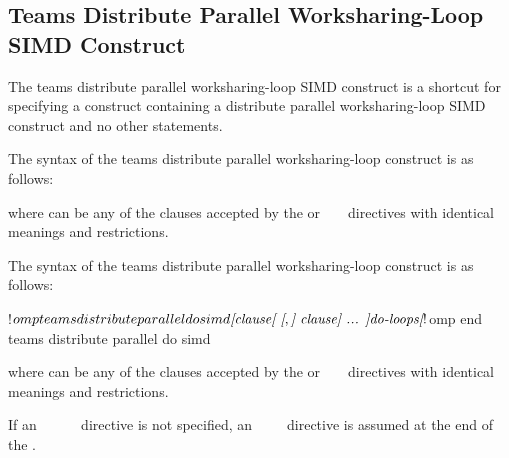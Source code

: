 \subsection{Teams Distribute Parallel Worksharing-Loop SIMD Construct}
\label{subsec:Teams Distribute Parallel Worksharing-Loop SIMD Construct}
\summary
The teams distribute parallel worksharing-loop SIMD construct is a shortcut for specifying a 
construct containing a distribute parallel worksharing-loop SIMD construct and no other statements.


\syntax
\begin{ccppspecific}
The syntax of the teams distribute parallel worksharing-loop construct is as follows:

\begin{ompcPragma}[fontsize=\small]
#pragma omp teams distribute parallel for simd \plc{\}
            \plc{[clause[ [},\plc{] clause] ... ] new-line}
    \plc{for-loops}
\end{ompcPragma}

where  can be any of the clauses accepted by the  or
~ ~
directives with identical meanings and restrictions.
\end{ccppspecific}

\begin{fortranspecific}
The syntax of the teams distribute parallel worksharing-loop construct is as follows:

\begin{ompfPragma}
!$omp teams distribute parallel do simd \plc{[clause[ [},\plc{] clause] ... ]}
    \plc{do-loops}
\plc{[}!$omp end teams distribute parallel do simd\plc{]}
\end{ompfPragma}

where  can be any of the clauses accepted by the  or
~ ~
directives with identical meanings and restrictions.

If an ~~~~~ directive is not specified, an
~  ~~ directive is assumed at the end of
the .
\end{fortranspecific}

